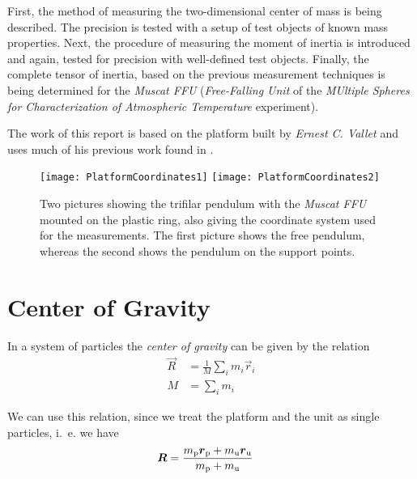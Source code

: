 \documentclass[journal]{IEEEtran}
\begin{document}
First, the method of measuring the two-dimensional center of mass is being described. The precision is tested with a setup of test objects of known mass properties.
Next, the procedure of measuring the moment of inertia is introduced and again, tested for precision with well-defined test objects.
Finally, the complete tensor of inertia, based on the previous measurement techniques is being determined for the \emph{Muscat FFU} (\emph{Free-Falling Unit} of the \emph{MUltiple Spheres for Characterization of Atmospheric Temperature} experiment).

The work of this report is based on the platform built by \emph{Ernest C. Vallet} and uses much of his previous work found in \cite{report:ernest}.

% 
% 
% 
% 

\begin{figure*}
	\centering
	\texttt{[image: PlatformCoordinates1]}
	\texttt{[image: PlatformCoordinates2]}
	\caption{Two pictures showing the trifilar pendulum with the \emph{Muscat FFU} mounted on the plastic ring, also giving the coordinate system used for the measurements. The first picture shows the free pendulum, whereas the second shows the pendulum on the support points.}
	\label{fig:Platform}
\end{figure*}

\section{Center of Gravity}

In a system of particles the \emph{center of gravity} can be given by the relation \cite{book:goldstein}
\begin{align}
	\vec{R} & = \frac{1}{M} \sum_{i} m_i \vec{r}_i \\
	\label{eq:SystemCoG}
	M & = \sum_{i} m_i
\end{align}

We can use this relation, since we treat the platform and the unit as single particles, i.~e. we have
\begin{align}
	\vec{R} & = \frac{m_{\textup{p}} \vec{r}_{\textup{p}} + m_{\textup{u}} \vec{r}_{\textup{u}}}{m_{\textup{p}} + m_{\textup{u}}} \label{eq:CogFull}
\end{align}
\end{document}
